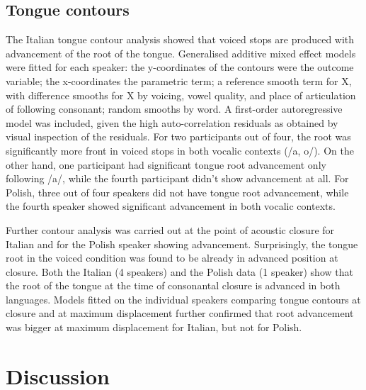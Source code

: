 \documentclass[authoryear, twocolumn]{elsarticle}
\begin{document}
\subsection{Tongue contours}\label{tongue-contours}

The Italian tongue contour analysis showed that voiced stops are
produced with advancement of the root of the tongue. Generalised
additive mixed effect models were fitted for each speaker: the
y-coordinates of the contours were the outcome variable; the
x-coordinates the parametric term; a reference smooth term for X, with
difference smooths for X by voicing, vowel quality, and place of
articulation of following consonant; random smooths by word. A
first-order autoregressive model was included, given the high
auto-correlation residuals as obtained by visual inspection of the
residuals. For two participants out of four, the root was significantly
more front in voiced stops in both vocalic contexts (/a, o/). On the
other hand, one participant had significant tongue root advancement only
following /a/, while the fourth participant didn't show advancement at
all. For Polish, three out of four speakers did not have tongue root
advancement, while the fourth speaker showed significant advancement in
both vocalic contexts.

Further contour analysis was carried out at the point of acoustic
closure for Italian and for the Polish speaker showing advancement.
Surprisingly, the tongue root in the voiced condition was found to be
already in advanced position at closure. Both the Italian (4 speakers)
and the Polish data (1 speaker) show that the root of the tongue at the
time of consonantal closure is advanced in both languages. Models fitted
on the individual speakers comparing tongue contours at closure and at
maximum displacement further confirmed that root advancement was bigger
at maximum displacement for Italian, but not for Polish.

\section{Discussion}\label{discussion}
\end{document}

